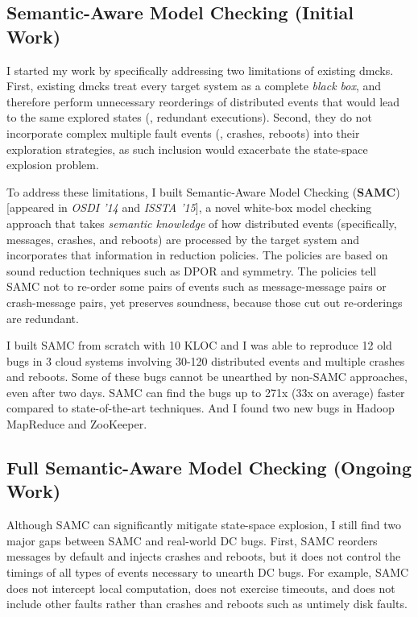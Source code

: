 \documentclass[11pt]{article}
\begin{document}
\subsection{Semantic-Aware Model Checking (Initial Work)} 

I started my work by specifically addressing two limitations of existing dmcks.
First, existing dmcks treat every target system as a complete \textit{black
box}, and therefore perform unnecessary reorderings of distributed events that
would lead to the same explored states (\ie, redundant executions). Second, they
do not incorporate complex multiple fault events (\eg, crashes, reboots) into
their exploration strategies, as such inclusion would exacerbate the state-space
explosion problem.

To address these limitations, I built Semantic-Aware Model Checking
(\textbf{SAMC}) [appeared in \textit{OSDI '14} and \textit{ISSTA '15}], a novel
white-box model checking approach that takes \textit{semantic knowledge} of how
distributed events (specifically, messages, crashes, and reboots) are processed
by the target system and incorporates that information in reduction policies.
The policies are based on sound reduction techniques such as DPOR and symmetry.
The policies tell SAMC not to re-order some pairs of events such as
message-message pairs or crash-message pairs, yet preserves soundness, because
those cut out re-orderings are redundant.

I built SAMC from scratch with 10 KLOC and I was able to reproduce 12 old bugs
in 3 cloud systems involving 30-120 distributed events and multiple crashes and
reboots. Some of these bugs cannot be unearthed by non-SAMC approaches, even
after two days. SAMC can find the bugs up to 271x (33x on average) faster
compared to state-of-the-art techniques. And I found two new bugs in Hadoop
MapReduce and ZooKeeper.

\subsection{Full Semantic-Aware Model Checking (Ongoing Work)} 

Although SAMC can significantly mitigate state-space explosion, I still find two
major gaps between SAMC and real-world DC bugs. First, SAMC reorders messages by
default and injects crashes and reboots, but it does not control the timings of
all types of events necessary to unearth DC bugs. For example, SAMC does not
intercept local computation, does not exercise timeouts, and does not include
other faults rather than crashes and reboots such as untimely disk faults.
\end{document}
